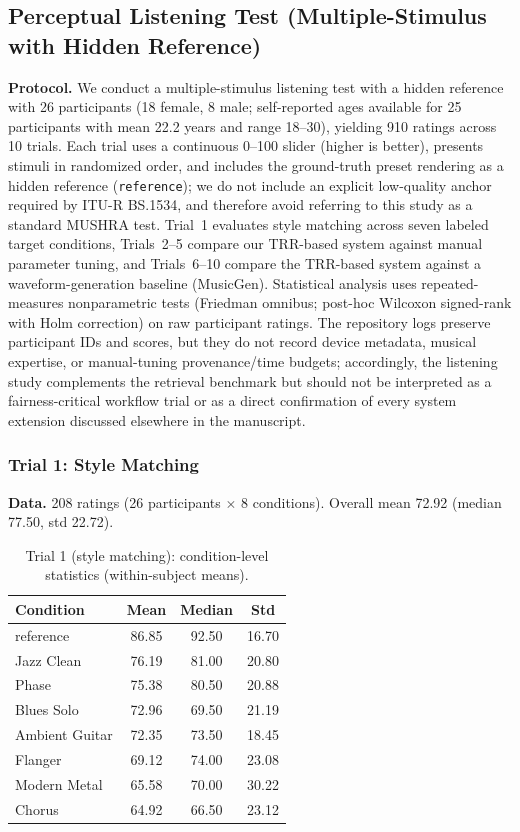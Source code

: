 \subsection{Perceptual Listening Test (Multiple-Stimulus with Hidden Reference)}
\label{ssec:mushra}

\textbf{Protocol.} We conduct a multiple-stimulus listening test with a hidden reference with 26 participants (18 female, 8 male; self-reported ages available for 25 participants with mean 22.2 years and range 18--30), yielding 910 ratings across 10 trials. Each trial uses a continuous 0--100 slider (higher is better), presents stimuli in randomized order, and includes the ground-truth preset rendering as a hidden reference (\texttt{reference}); we do not include an explicit low-quality anchor required by ITU-R BS.1534, and therefore avoid referring to this study as a standard MUSHRA test. Trial~1 evaluates style matching across seven labeled target conditions, Trials~2--5 compare our TRR-based system against manual parameter tuning, and Trials~6--10 compare the TRR-based system against a waveform-generation baseline (MusicGen). Statistical analysis uses repeated-measures nonparametric tests (Friedman omnibus; post-hoc Wilcoxon signed-rank with Holm correction) on raw participant ratings. The repository logs preserve participant IDs and scores, but they do not record device metadata, musical expertise, or manual-tuning provenance/time budgets; accordingly, the listening study complements the retrieval benchmark but should not be interpreted as a fairness-critical workflow trial or as a direct confirmation of every system extension discussed elsewhere in the manuscript.

\subsubsection{Trial 1: Style Matching}
\textbf{Data.} 208 ratings (26 participants $\times$ 8 conditions). Overall mean 72.92 (median 77.50, std 22.72).

\begin{table}[t]
	\centering
	\caption{Trial 1 (style matching): condition-level statistics (within-subject means).}
	\label{tab:mushra_trial1_stats}
	\begin{tabular}{lccc}
		\toprule
		\textbf{Condition} & \textbf{Mean} & \textbf{Median} & \textbf{Std} \\
		\midrule
		reference & 86.85 & 92.50 & 16.70 \\
		Jazz Clean & 76.19 & 81.00 & 20.80 \\
		Phase & 75.38 & 80.50 & 20.88 \\
		Blues Solo & 72.96 & 69.50 & 21.19 \\
		Ambient Guitar & 72.35 & 73.50 & 18.45 \\
		Flanger & 69.12 & 74.00 & 23.08 \\
		Modern Metal & 65.58 & 70.00 & 30.22 \\
		Chorus & 64.92 & 66.50 & 23.12 \\
		\bottomrule
	\end{tabular}
\end{table}

